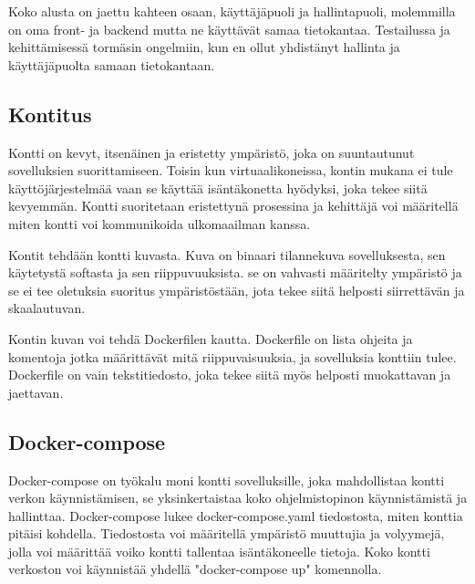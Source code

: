 


Koko alusta on jaettu kahteen osaan, käyttäjäpuoli ja hallintapuoli, molemmilla on oma front- ja backend mutta ne käyttävät samaa tietokantaa.
Testailussa ja kehittämisessä tormäsin ongelmiin, kun en ollut yhdistänyt hallinta ja käyttäjäpuolta samaan tietokantaan.




\subsection*{Kontitus}




Kontti on kevyt, itsenäinen ja eristetty ympäristö, joka on suuntautunut sovelluksien suorittamiseen.
Toisin kun virtuaalikoneissa, kontin mukana ei tule käyttöjärjestelmää vaan se käyttää isäntäkonetta hyödyksi, joka tekee siitä kevyemmän.
Kontti suoritetaan eristettynä prosessina ja kehittäjä voi määritellä miten kontti voi kommunikoida ulkomaailman kanssa.
\medskip

Kontit tehdään kontti kuvasta.
Kuva on binaari tilannekuva sovelluksesta, sen käytetystä softasta ja sen riippuvuuksista.
se on vahvasti määritelty ympäristö ja se ei tee oletuksia suoritus ympäristöstään, jota tekee siitä helposti siirrettävän ja skaalautuvan.
\medskip

Kontin kuvan voi tehdä Dockerfilen kautta. Dockerfile on lista ohjeita ja komentoja jotka määrittävät mitä riippuvaisuuksia, ja sovelluksia konttiin tulee.
Dockerfile on vain tekstitiedosto, joka tekee siitä myös helposti muokattavan ja jaettavan.

\medskip






\subsection*{Docker-compose}


Docker-compose on työkalu moni kontti sovelluksille, joka mahdollistaa kontti verkon käynnistämisen, se yksinkertaistaa koko ohjelmistopinon käynnistämistä ja hallinttaa.
Docker-compose lukee docker-compose.yaml tiedostosta, miten konttia pitäisi kohdella.
Tiedostosta voi määritellä ympäristö muuttujia ja volyymejä, jolla voi määrittää voiko kontti tallentaa isäntäkoneelle tietoja.
Koko kontti verkoston voi käynnistää yhdellä "docker-compose up"{} komennolla.


